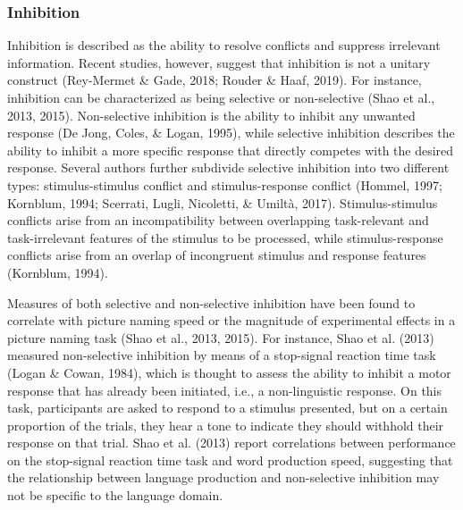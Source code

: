 \documentclass[
  man,floatsintext]{apa6}
\begin{document}
\hypertarget{inhibition}{%
\subsubsection{Inhibition}\label{inhibition}}

Inhibition is described as the ability to resolve conflicts and suppress irrelevant information. Recent studies, however, suggest that inhibition is not a unitary construct (Rey-Mermet \& Gade, 2018; Rouder \& Haaf, 2019). For instance, inhibition can be characterized as being selective or non-selective (Shao et al., 2013, 2015). Non-selective inhibition is the ability to inhibit any unwanted response (De Jong, Coles, \& Logan, 1995), while selective inhibition describes the ability to inhibit a more specific response that directly competes with the desired response. Several authors further subdivide selective inhibition into two different types: stimulus-stimulus conflict and stimulus-response conflict (Hommel, 1997; Kornblum, 1994; Scerrati, Lugli, Nicoletti, \& Umiltà, 2017). Stimulus-stimulus conflicts arise from an incompatibility between overlapping task-relevant and task-irrelevant features of the stimulus to be processed, while stimulus-response conflicts arise from an overlap of incongruent stimulus and response features (Kornblum, 1994).

Measures of both selective and non-selective inhibition have been found to correlate with picture naming speed or the magnitude of experimental effects in a picture naming task (Shao et al., 2013, 2015). For instance, Shao et al. (2013) measured non-selective inhibition by means of a stop-signal reaction time task (Logan \& Cowan, 1984), which is thought to assess the ability to inhibit a motor response that has already been initiated, i.e., a non-linguistic response. On this task, participants are asked to respond to a stimulus presented, but on a certain proportion of the trials, they hear a tone to indicate they should withhold their response on that trial. Shao et al. (2013) report correlations between performance on the stop-signal reaction time task and word production speed, suggesting that the relationship between language production and non-selective inhibition may not be specific to the language domain.
\end{document}
